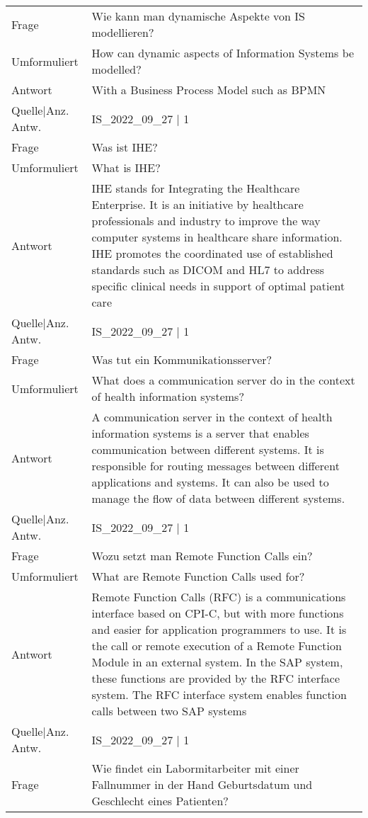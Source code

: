 {\begin{landscape}
\begin{longtable}{p{3cm}p{}}
    Frage & Wie kann man dynamische Aspekte von IS modellieren? \\
    Umformuliert & How can dynamic aspects of Information Systems be modelled? \\
    Antwort & With a Business Process Model such as BPMN \\
    Quelle|Anz. Antw. & IS\_2022\_09\_27 | 1 \\
    \midrule
    Frage & Was ist IHE? \\
    Umformuliert & What is IHE? \\
    Antwort & IHE stands for Integrating the Healthcare Enterprise.
    It is an initiative by healthcare professionals and industry to improve the way computer systems in healthcare share information.
    IHE promotes the coordinated use of established standards such as DICOM and HL7 to address specific clinical needs in support of optimal patient care \\
    Quelle|Anz. Antw. & IS\_2022\_09\_27 | 1 \\
    \midrule
    Frage & Was tut ein Kommunikationsserver? \\
    Umformuliert & What does a communication server do  in the context of health information systems? \\
    Antwort & A communication server in the context of health information systems is a server that enables communication between different systems.
    It is responsible for routing messages between different applications and systems.
    It can also be used to manage the flow of data between different systems.\\
    Quelle|Anz. Antw. & IS\_2022\_09\_27 | 1 \\
    \midrule
    Frage & Wozu setzt man Remote Function Calls ein? \\
    Umformuliert & What are Remote Function Calls used for? \\
    Antwort & Remote Function Calls (RFC) is a communications interface based on CPI-C, but with more functions and easier for application programmers to use.
    It is the call or remote execution of a Remote Function Module in an external system.
    In the SAP system, these functions are provided by the RFC interface system.
    The RFC interface system enables function calls between two SAP systems \\
    Quelle|Anz. Antw. & IS\_2022\_09\_27 | 1 \\
    \midrule
    Frage & Wie findet ein Labormitarbeiter mit einer Fallnummer in der Hand Geburtsdatum und Geschlecht eines Patienten? \\

\end{longtable}
\end{landscape}}
